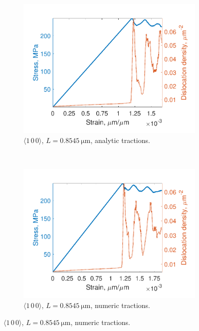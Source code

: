 \begin{figure}
    \centering
    \begin{subfigure}[t]{0.45\linewidth}
        \centering
        \includegraphics[width=\linewidth]{../data/density_11-Mar-2021_8_tensile_ni_100.pdf}
        \caption{$\langle 1\, 0\, 0 \rangle$, $L = \SI{0.8545}{\micro\metre}$, analytic tractions.}
        \label{sf:stressDens1}
    \end{subfigure}
    ~
    \begin{subfigure}[t]{0.45\linewidth}
        \centering
        \includegraphics[width=\linewidth]{../data/density_11-Mar-2021_numT_8_tensile_ni_100.pdf}
        \caption{$\langle 1\, 0\, 0 \rangle$, $L = \SI{0.8545}{\micro\metre}$, numeric tractions.}
        \label{sf:stressDens2}
    \end{subfigure}


\end{figure}
